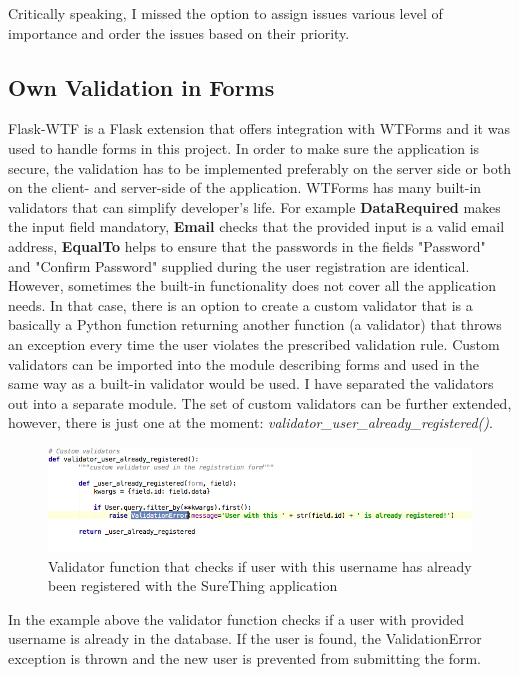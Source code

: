 Critically speaking, I missed the option to assign issues various level of importance and order the issues based on their priority.

\subsection{Own Validation in Forms}
Flask-WTF is a Flask extension that offers integration with WTForms and it was used to handle forms in this project. In order to make sure the application is secure, the validation has to be implemented preferably on the server side or both on the client- and server-side of the application. WTForms has many built-in validators that can simplify developer's life. For example \textbf{DataRequired} makes the input field mandatory, \textbf{Email} checks that the provided input is a valid email address, \textbf{EqualTo} helps to ensure that the passwords in the fields "Password" and "Confirm Password" supplied during the user registration are identical. However, sometimes the built-in functionality does not cover all the application needs. In that case, there is an option to create a custom validator that is a basically a Python function returning another function (a validator) that throws an exception every time the user violates the prescribed validation rule. Custom validators can be imported into the module describing forms and used in the same way as a built-in validator would be used. I have separated the validators out into a separate module. The set of custom validators can be further extended, however, there is just one at the moment: \emph{validator\_user\_already\_registered()}. 

\begin{figure}[H]
	\begin{center}
		\includegraphics[width=.90\linewidth,natwidth=610,natheight=642]{impl/images/customValidator}
		\caption{Validator function that checks if user with this username has already been registered with the SureThing application} \label{fig:using:customValidator}
	\end{center}
\end{figure}

In the example above the validator function checks if a user with provided username is already in the database. If the user is found, the ValidationError exception is thrown and the new user is prevented from submitting the form.

